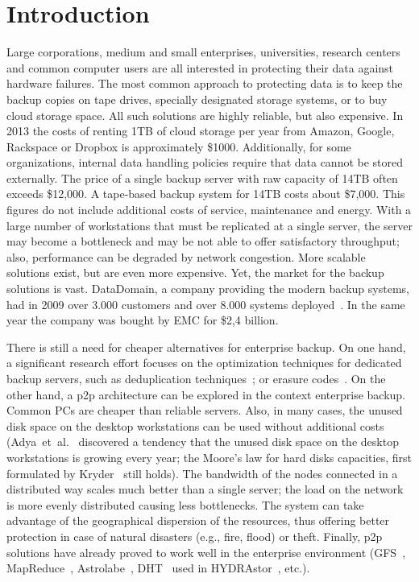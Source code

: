 \documentclass[10pt, final, conference, letterpaper]{IEEEtran}
\begin{document}
\section{Introduction}\label{sec::introduction}
Large corporations, medium and small enterprises, universities, research centers and common computer users are all interested in protecting their data against hardware failures.
The most common approach to protecting data is to keep the backup copies on tape drives, specially designated storage systems, or to buy cloud storage space. All such solutions are highly reliable, but also expensive. In 2013 the costs of renting 1TB of cloud storage per year from Amazon, Google, Rackspace or Dropbox is approximately \$1000. Additionally, for some organizations, internal data handling policies require that data cannot be stored externally. The price of a single backup server with raw capacity of 14TB often exceeds \$12,000. A tape-based backup system for 14TB costs about \$7,000. This figures do not include additional costs of service, maintenance and energy.
With a large number of workstations that must be replicated at a single server, the server may become a bottleneck and may be not able to offer satisfactory throughput; also, performance can be degraded by network congestion. More scalable solutions exist, but are even more expensive.
Yet, the market for the backup solutions is vast. DataDomain, a company providing the modern backup systems, had in 2009 over 3.000 customers and over 8.000 systems deployed~\cite{dataDomainCustomers}. In the same year the company was bought by EMC for \$2,4 billion.

There is still a need for cheaper alternatives for enterprise backup. On one hand, a significant research effort focuses on the optimization techniques for dedicated backup servers, such as 
deduplication techniques~\cite{Meyer:2011:SPD:1960475.1960476, Dong:2011:TSD:1960475.1960477}; or erasure codes~\cite{conf/infocom/OggierD11, conf/icdcn/Pamies-JuarezOD13}. On the other hand, a p2p architecture can be explored in the context enterprise backup. Common PCs are cheaper than reliable servers. Also, in many cases, the unused disk space on the desktop workstations can be used without additional costs (Adya~et~al.~\cite{farsite} discovered a tendency that the unused disk space on the desktop workstations is growing every year; the Moore's law for hard disks capacities, first formulated by Kryder~\cite{citeulike:8870751} still holds). The bandwidth of the nodes connected in a distributed way scales much better than a single server; the load on the network is more evenly distributed causing less bottlenecks. The system can take advantage of the geographical dispersion of the resources, thus offering better protection in case of natural disasters (e.g., fire, flood) or theft. Finally, p2p solutions have already proved to work well in the enterprise environment (GFS~\cite{googlefs}, MapReduce~\cite{Dean:2008:MSD:1327452.1327492}, Astrolabe~\cite{Renesse01astrolabe:a}, DHT~\cite{dHash} used in HYDRAstor~\cite{hydraStore}, etc.).
\end{document}
